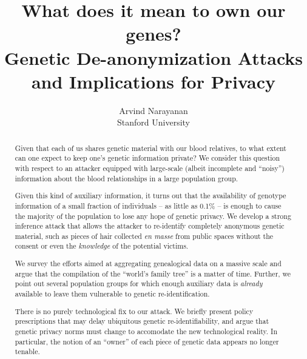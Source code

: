 \documentclass{article}
\title{What does it mean to own our genes?\\
{\small Genetic De-anonymization Attacks and Implications for Privacy}}
\author{Arvind Narayanan \\
{\small Stanford University}}
\begin{document}
\maketitle




\begin{abstract}
Given that each of us shares genetic material with our blood relatives, to what extent can one expect to keep one's genetic information private? We consider this question with respect to an attacker equipped with large-scale (albeit incomplete and ``noisy'') information about the blood relationships in a large population group. 

Given this kind of auxiliary information, it turns out that the availability of genotype information of a small fraction of individuals -- as little as 0.1\% -- is enough to cause the majority of the population to lose any hope of genetic privacy. We develop a strong inference attack that allows the attacker to re-identify completely anonymous genetic material, such as pieces of hair collected {\em en masse} from public spaces without the consent or even the {\em knowledge} of the potential victims.

We survey the efforts aimed at aggregating genealogical  data on a massive scale and argue that the compilation of the ``world's family tree'' is a matter of time. Further, we point out several population groups for which enough auxiliary data is {\em already} available to leave them vulnerable to genetic re-identification.

There is no purely technological fix to our attack. We briefly present policy prescriptions that may delay ubiquitous genetic re-identifiability, and argue that genetic privacy norms must change to accomodate the new technological reality. In particular, the notion of an ``owner'' of each piece of genetic data appears no longer tenable.
 



\end{abstract}
\end{document}

